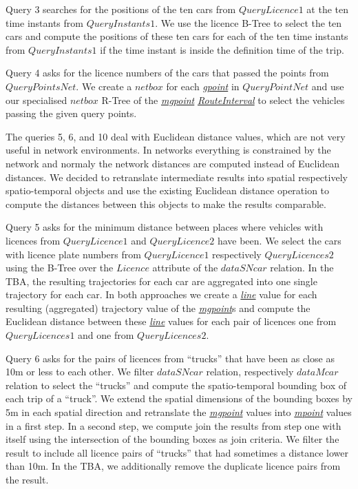 \documentclass[a4paper]{article}
\newcommand{\dt}[1]{\textsl{\underline{#1}}}
\begin{document}
Query 3 searches for the positions of the ten cars from $QueryLicence1$ at the
ten time instants from $QueryInstants1$. We use the licence B-Tree to select the
ten cars and compute the positions of these ten cars for each of the ten time
instants from $QueryInstants1$ if the time instant is inside the definition time
of the trip.

Query 4 asks for the licence numbers of the cars that passed the points
from $QueryPointsNet$. We create a $netbox$ for each \dt{gpoint} in $QueryPointNet$
and use our specialised $netbox$ R-Tree of the \dt{mgpoint} \dt{RouteInterval} to
select the vehicles passing the given query points.

The queries 5, 6, and 10 deal with Euclidean distance values, which are not very
useful in network environments. In networks everything is constrained by the
network and normaly the network distances are computed instead of Euclidean
distances. We decided to retranslate intermediate results
into spatial respectively spatio-temporal objects and use the existing
Euclidean distance operation to compute the distances between this objects to make
the results comparable.

Query 5 asks for the minimum distance between places where vehicles with
licences from $QueryLicence1$ and $QueryLicence2$ have been. We select the cars
with licence plate numbers from $QueryLicence1$ respectively $QueryLicences2$ using the
B-Tree over the $Licence$ attribute of the $dataSNcar$ relation. In the TBA, the
resulting trajectories for each car are aggregated into one single trajectory
for each car. In both approaches we create a \dt{line} value for each resulting
(aggregated) trajectory value of the \dt{mgpoint}s and compute the Euclidean distance
between these \dt{line} values for each pair of licences one from $QueryLicences1$ and one
from $QueryLicences2$.

Query 6 asks for the pairs of licences from ``trucks'' that have been as close as
10m or less to each other. We filter $dataSNcar$ relation, respectively $dataMcar$
relation to select the ``trucks'' and compute the spatio-temporal bounding box
of each trip of a ``truck''. We extend the spatial dimensions of the bounding boxes
by 5m in each spatial direction and retranslate the \dt{mgpoint} values into \dt{mpoint}
values in a first step. In a second step, we compute join the results from
step one with itself using the intersection of the bounding boxes as join criteria.
We filter the result to include all licence pairs of ``trucks'' that had sometimes
a distance lower than 10m. In the TBA, we additionally remove the duplicate licence
pairs from the result.
\end{document}
